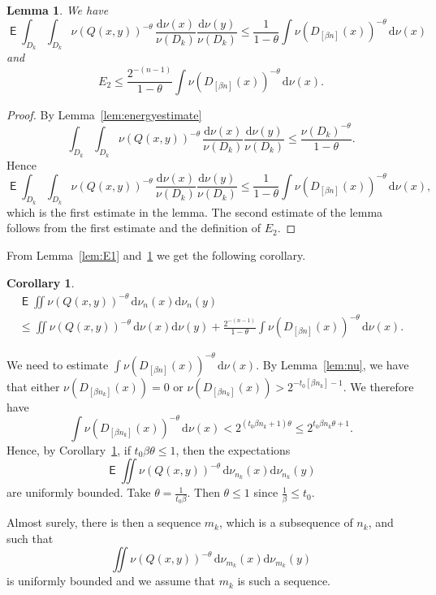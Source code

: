 \documentclass[10pt]{amsart}
\newtheorem{lemm}[theo]{Lemma}\newtheorem{prop}[theo]{Proposition}\newtheorem{coro}[theo]{Corollary}\newtheorem{conj}[theo]{Conjecture}
\theoremstyle{definition}\newtheorem{defi}[theo]{Definition}\newtheorem{rema}[theo]{Remark}\newtheorem{exam}[theo]{Example}\newtheorem{exem}[theo]{Example}\newtheorem{nota}[theo]{Notation}
\DeclareMathOperator{\E}{\mathsf{E}}
\newcommand*{\dd}{\mathrm{d}}
\begin{document}
\begin{lemm}\label{lem:E2}
We have
\[
\E \int_{D_k} \int_{D_k} \nu(Q(x,y))^{-\theta} \, \frac{\dd
\nu (x)}{\nu (D_k)} \frac{\dd \nu (y)}{\nu (D_k)} \leq
\frac{1}{1-\theta} \int \nu (D_{[\beta n]} (x))^{-\theta} \,
\dd \nu (x)
\]
and
\[
E_2 \leq \frac{2^{-(n-1)}}{1-\theta} \int \nu (D_{[\beta n]} (x))^{-\theta} \, \dd \nu (x).
\]
\end{lemm}

\begin{proof}
By Lemma~\ref{lem:energyestimate}
\[
\int_{D_k} \int_{D_k} \nu(Q(x,y))^{-\theta} \, \frac{\dd \nu (x)}{\nu (D_k)} \frac{\dd \nu (y)}{\nu (D_k)} \leq
\frac{\nu (D_k)^{-\theta}}{1-\theta}.
\]
Hence
\[
\E \int_{D_k} \int_{D_k} \nu(Q(x,y))^{-\theta} \, \frac{\dd
\nu (x)}{\nu (D_k)} \frac{\dd \nu (y)}{\nu (D_k)} \leq
\frac{1}{1-\theta} \int \nu (D_{[\beta n]} (x))^{-\theta} \,
\dd \nu (x),
\]
which is the first estimate in the lemma. The second estimate of the lemma follows from the first estimate and the definition of $E_2$.
\end{proof}

From Lemma~\ref{lem:E1} and~\ref{lem:E2} we get the following corollary.

\begin{coro}\label{cor:expectation}
\begin{multline*}
\E \iint \nu (Q(x,y))^{-\theta} \, \dd \nu_n (x) \dd
\nu_n (y) \\ \leq \iint \nu (Q(x,y))^{-\theta} \, \dd \nu (x) \dd \nu (y) + \frac{2^{-(n-1)}}{1-\theta} \int \nu (D_{[\beta n]} (x))^{-\theta} \, \dd \nu (x).
\end{multline*}
\end{coro}

We need to estimate $\int \nu (D_{[\beta n]} (x))^{-\theta} \,
\dd \nu(x)$. By Lemma~\ref{lem:nu}, we have that either $\nu (D_{[\beta n_k]} (x)) = 0$ or $\nu (D_{[\beta n_k]} (x)) > 2^{-t_0 [\beta n_k] - 1}$. We therefore have
\[
\int \nu (D_{[\beta n_k]} (x))^{-\theta} \, \dd \nu(x) < 2^{(t_0 \beta n_k + 1) \theta} \leq 2^{t_0 \beta n_k \theta + 1}.
\]
Hence, by Corollary~\ref{cor:expectation}, if $t_0 \beta \theta \leq 1$, then the expectations
\[
\E \iint \nu (Q(x,y))^{-\theta} \, \dd \nu_{n_k} (x) \dd
\nu_{n_k} (y)
\]
are uniformly bounded. Take $\theta = \frac{1}{t_0 \beta}$. Then $\theta \leq 1$ since $\frac{1}{\beta} \leq t_0$.

Almost surely, there is then a sequence $m_k$, which is a subsequence of $n_k$, and such that
\[
\iint \nu (Q(x,y))^{-\theta} \, \dd \nu_{m_k} (x) \dd
\nu_{m_k} (y)
\]
is uniformly bounded and we assume that $m_k$ is such a sequence.
\end{document}
